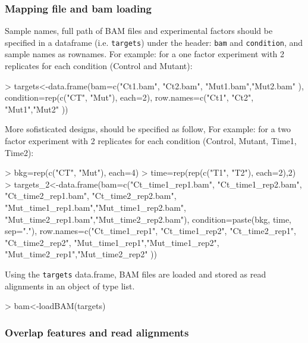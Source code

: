 \documentclass{article}
\begin{document}
\subsubsection{Mapping file and bam loading}%
Sample names, full path of BAM files and experimental factors should be specified in a dataframe (i.e. \texttt{targets}) under the header: \texttt{bam} and \texttt{condition}, and sample names as rownames. For example: for a one factor experiment with 2 replicates for each condition (Control and Mutant):
\begin{Schunk}
\begin{Sinput}
> targets<-data.frame(bam=c("Ct1.bam", "Ct2.bam", "Mut1.bam","Mut2.bam" ),
                     condition=rep(c("CT", "Mut"), each=2), 
                     row.names=c("Ct1", "Ct2", "Mut1","Mut2" ))
\end{Sinput}
\end{Schunk}

More sofisticated designs, should be specified as follow, For example: for a two factor experiment with 2 replicates for each condition (Control, Mutant, Time1, Time2):
\begin{Schunk}
\begin{Sinput}
> bkg=rep(c("CT", "Mut"), each=4)
> time=rep(rep(c("T1", "T2"), each=2),2)
> targets_2<-data.frame(bam=c("Ct_time1_rep1.bam", "Ct_time1_rep2.bam", 
                             "Ct_time2_rep1.bam", "Ct_time2_rep2.bam",
                             "Mut_time1_rep1.bam","Mut_time1_rep2.bam",
                             "Mut_time2_rep1.bam","Mut_time2_rep2.bam"),
                       condition=paste(bkg, time, sep="."),
                       row.names=c("Ct_time1_rep1", "Ct_time1_rep2", 
                             "Ct_time2_rep1", "Ct_time2_rep2",
                             "Mut_time1_rep1","Mut_time1_rep2",
                             "Mut_time2_rep1","Mut_time2_rep2" ))
\end{Sinput}
\end{Schunk}

Using the \texttt{targets} data.frame, BAM files are loaded and stored as read alignments in an object of type list.

\begin{Schunk}
\begin{Sinput}
> bam<-loadBAM(targets)
\end{Sinput}
\end{Schunk}

\subsubsection{Overlap features and read alignments} 
\end{document}
